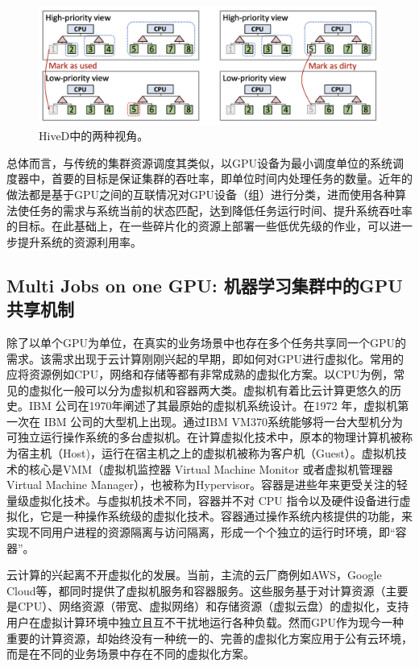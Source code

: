 \begin{figure}[h]
    \centerline{\includegraphics[width=\textwidth]{figures/hived-diff-view.png}}
    \caption{HiveD中的两种视角。}
    \label{hived_diff_view}
\end{figure}

总体而言，与传统的集群资源调度其类似，以GPU设备为最小调度单位的系统调度器中，首要的目标是保证集群的吞吐率，即单位时间内处理任务的数量。近年的做法都是基于GPU之间的互联情况对GPU设备（组）进行分类，进而使用各种算法使任务的需求与系统当前的状态匹配，达到降低任务运行时间、提升系统吞吐率的目标。在此基础上，在一些碎片化的资源上部署一些低优先级的作业，可以进一步提升系统的资源利用率。

\subsection{Multi Jobs on one GPU: 机器学习集群中的GPU共享机制}
除了以单个GPU为单位，在真实的业务场景中也存在多个任务共享同一个GPU的需求。该需求出现于云计算刚刚兴起的早期，即如何对GPU进行虚拟化。常用的应将资源例如CPU，网络和存储等都有非常成熟的虚拟化方案。以CPU为例，常见的虚拟化一般可以分为虚拟机和容器两大类。虚拟机有着比云计算更悠久的历史。IBM 公司在1970年阐述了其最原始的虚拟机系统设计\parencite{goldberg1974survey}。在1972 年，虚拟机第一次在 IBM 公司的大型机上出现。通过IBM VM370系统能够将一台大型机分为可独立运行操作系统的多台虚拟机。在计算虚拟化技术中，原本的物理计算机被称为宿主机（Host)，运行在宿主机之上的虚拟机被称为客户机（Guest）。虚拟机技术的核心是VMM（虚拟机监控器 Virtual Machine Monitor 或者虚拟机管理器 Virtual Machine Manager），也被称为Hypervisor\parencite{barham2003xen}。容器是进些年来更受关注的轻量级虚拟化技术。与虚拟机技术不同，容器并不对 CPU 指令以及硬件设备进行虚拟化，它是一种操作系统级的虚拟化技术。容器通过操作系统内核提供的功能，来实现不同用户进程的资源隔离与访问隔离，形成一个个独立的运行时环境，即“容器”。

云计算的兴起离不开虚拟化的发展。当前，主流的云厂商例如AWS，Google Cloud等，都同时提供了虚拟机服务和容器服务。这些服务基于对计算资源（主要是CPU）、网络资源（带宽、虚拟网络）和存储资源（虚拟云盘）的虚拟化，支持用户在虚拟计算环境中独立且互不干扰地运行各种负载。然而GPU作为现今一种重要的计算资源，却始终没有一种统一的、完善的虚拟化方案应用于公有云环境，而是在不同的业务场景中存在不同的虚拟化方案。

